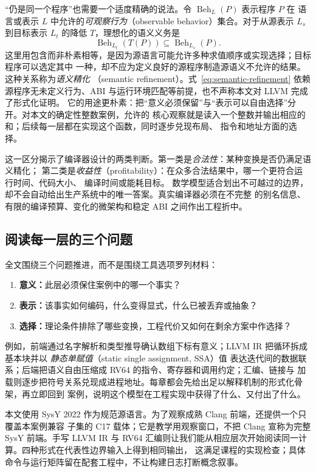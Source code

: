 “仍是同一个程序”也需要一个适度精确的说法。令 $\operatorname{Beh}_{L}(P)$ 表示程序 $P$ 在
语言或表示 $L$ 中允许的\emph{可观察行为}（observable behavior）集合。对于从源表示 $L_s$
到目标表示 $L_t$ 的降低 $T$，理想化的语义义务是
\begin{equation}
  \operatorname{Beh}_{L_t}(T(P))\subseteq \operatorname{Beh}_{L_s}(P).
  \label{eq:semantic-refinement}
\end{equation}
这里用包含而非朴素相等，是因为源语言可能允许多种求值顺序或实现选择；目标程序可以选定其中
一种，却不应为定义良好的源程序制造源语义不允许的结果。这种关系称为\emph{语义精化}
（semantic refinement）。式~\eqref{eq:semantic-refinement}
依赖源程序无未定义行为、ABI 与运行环境匹配等前提，也不声称本文对 LLVM 完成了形式化证明。
它的用途更朴素：把“意义必须保留”与“表示可以自由选择”分开。对本文的确定性整数案例，允许的
核心观察就是读入一个整数并输出相应的和；后续每一层都在实现这个函数，同时逐步兑现布局、
指令和地址方面的选择。

这一区分揭示了编译器设计的两类判断。第一类是\emph{合法性}：某种变换是否仍满足语义精化；
第二类是\emph{收益性}（profitability）：在众多合法结果中，哪一个更符合运行时间、代码大小、
编译时间或能耗目标。
数学模型适合划出不可越过的边界，却不会自动给出生产系统中的唯一答案。真实编译器必须在不完整
的别名信息、有限的编译预算、变化的微架构和稳定 ABI 之间作出工程折中。

\subsection{阅读每一层的三个问题}

全文围绕三个问题推进，而不是围绕工具选项罗列材料：
\begin{enumerate}
  \item \textbf{意义：}此层必须保住案例中的哪一个事实？
  \item \textbf{表示：}该事实如何编码，什么变得显式，什么已被丢弃或抽象？
  \item \textbf{选择：}理论条件排除了哪些变换，工程代价又如何在剩余方案中作选择？
\end{enumerate}
例如，前端通过名字解析和类型推导确认数组下标有意义；LLVM IR 把循环拆成基本块并以
\emph{静态单赋值}（static single assignment, SSA）值
表达迭代间的数据联系；后端把语义自由压缩成 RV64 的指令、寄存器和调用约定；汇编、链接与
加载则逐步把符号关系兑现成进程地址。每章都会先给出足以解释机制的形式化骨架，再立即回到
案例，说明这个模型在工程实现中获得了什么、又付出了什么。

本文使用 SysY 2022 作为规范源语言。为了观察成熟 Clang 前端，还提供一个只覆盖本案例兼容
子集的 C17 载体；它是教学用观察窗口，不把 Clang 宣称为完整 SysY 前端。手写 LLVM IR 与
RV64 汇编则让我们能从相应层次开始阅读同一计算。四种形式在代表性边界输入上得到相同输出，
这满足课程的实现检查；具体命令与运行矩阵留在配套工程中，不让构建日志打断概念叙事。

